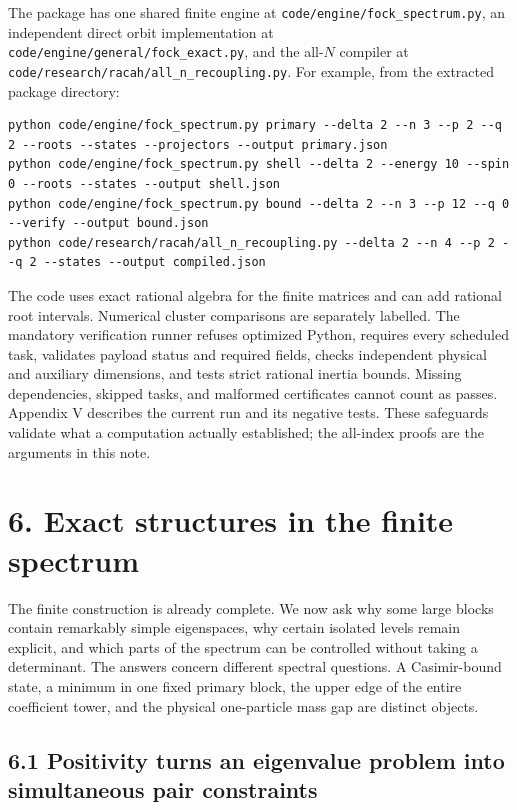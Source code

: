 \documentclass[a4paper,11pt]{article}
\numberwithin{equation}{section}
\begin{document}
The package has one shared finite engine at \texttt{code/engine/fock\_spectrum.py}, an independent direct orbit implementation at \texttt{code/engine/general/fock\_exact.py}, and the all-\(N\) compiler at \texttt{code/research/racah/all\_n\_recoupling.py}. For example, from the extracted package directory:

\begin{verbatim}
python code/engine/fock_spectrum.py primary --delta 2 --n 3 --p 2 --q 2 --roots --states --projectors --output primary.json
python code/engine/fock_spectrum.py shell --delta 2 --energy 10 --spin 0 --roots --states --output shell.json
python code/engine/fock_spectrum.py bound --delta 2 --n 3 --p 12 --q 0 --verify --output bound.json
python code/research/racah/all_n_recoupling.py --delta 2 --n 4 --p 2 --q 2 --states --output compiled.json
\end{verbatim}

The code uses exact rational algebra for the finite matrices and can add rational root intervals. Numerical cluster comparisons are separately labelled. The mandatory verification runner refuses optimized Python, requires every scheduled task, validates payload status and required fields, checks independent physical and auxiliary dimensions, and tests strict rational inertia bounds. Missing dependencies, skipped tasks, and malformed certificates cannot count as passes. Appendix V describes the current run and its negative tests. These safeguards validate what a computation actually established; the all-index proofs are the arguments in this note.

\clearpage
\hypertarget{exact-structures-in-the-finite-spectrum}{%
\section{6. Exact structures in the finite spectrum}\label{exact-structures-in-the-finite-spectrum}}

The finite construction is already complete. We now ask why some large blocks contain remarkably simple eigenspaces, why certain isolated levels remain explicit, and which parts of the spectrum can be controlled without taking a determinant. The answers concern different spectral questions. A Casimir-bound state, a minimum in one fixed primary block, the upper edge of the entire coefficient tower, and the physical one-particle mass gap are distinct objects.

\hypertarget{positivity-turns-an-eigenvalue-problem-into-simultaneous-pair-constraints}{%
\subsection{6.1 Positivity turns an eigenvalue problem into simultaneous pair constraints}\label{positivity-turns-an-eigenvalue-problem-into-simultaneous-pair-constraints}}
\end{document}
